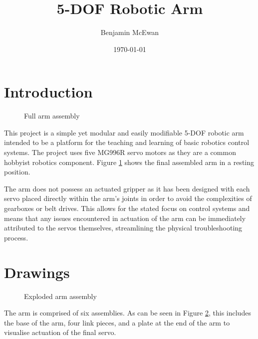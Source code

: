 \documentclass[a4paper,11pt]{article}
\begin{document}
\title{\textbf{5-DOF Robotic Arm}}
\author{Benjamin McEwan}
\date{\today}
\maketitle

\tableofcontents


\newpage
\section{Introduction}
\begin{figure}[h!]
    \centering
     
    \caption{Full arm assembly}
    \label{fig:arm}
\end{figure}

This project is a simple yet modular and easily modifiable 5-DOF robotic arm intended to be a platform for the teaching and learning of basic robotics control systems. The project uses five MG996R servo motors as they are a common hobbyist robotics component. Figure \ref{fig:arm} shows the final assembled arm in a resting position.

The arm does not possess an actuated gripper as it has been designed with each servo placed directly within the arm's joints in order to avoid the complexities of gearboxes or belt drives. This allows for the stated focus on control systems and means that any issues encountered in actuation of the arm can be immediately attributed to the servos themselves, streamlining the physical troubleshooting process.


\newpage
\section{Drawings}
\begin{figure}[H]
    \centering
    
    \caption{Exploded arm assembly}
    \label{fig:assembly}
\end{figure}

The arm is comprised of six assemblies. As can be seen in Figure \ref{fig:assembly}, this includes the base of the arm, four link pieces, and a plate at the end of the arm to visualise actuation of the final servo.
\end{document}
